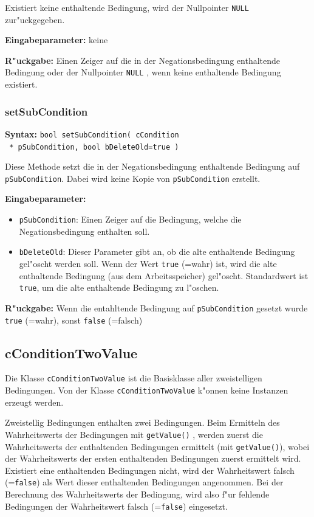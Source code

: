 Existiert keine enthaltende Bedingung, wird der Nullpointer \verb|NULL| zur"uckgegeben.

\bigskip\noindent
\textbf{Eingabeparameter:} keine

\bigskip\noindent
\textbf{R"uckgabe:} Einen Zeiger auf die in der Negationsbedingung enthaltende Bedingung oder der Nullpointer \verb|NULL| , wenn keine enthaltende Bedingung existiert.


\subsubsection{setSubCondition}

\textbf{Syntax:} \verb|bool setSubCondition( cCondition| \\\verb| * pSubCondition, bool bDeleteOld=true )|

\bigskip\noindent
Diese Methode setzt die in der Negationsbedingung enthaltende Bedingung auf \verb|pSubCondition|. Dabei wird keine Kopie von \verb|pSubCondition| erstellt.

\bigskip\noindent
\textbf{Eingabeparameter:}
\begin{itemize}
 \item \verb|pSubCondition|: Einen Zeiger auf die Bedingung, welche die Negationsbedingung enthalten soll.
 \item \verb|bDeleteOld|: Dieser Parameter gibt an, ob die alte enthaltende Bedingung gel"oscht werden soll. Wenn der Wert \verb|true| (=wahr) ist, wird die alte enthaltende Bedingung (aus dem Arbeitsspeicher) gel"oscht. Standardwert ist \verb|true|, um die alte enthaltende Bedingung zu l"oschen.
\end{itemize}

\bigskip\noindent
\textbf{R"uckgabe:} Wenn die entahltende Bedingung auf \verb|pSubCondition| gesetzt wurde \verb|true| (=wahr), sonst \verb|false| (=falsch)


\subsection{cConditionTwoValue}


Die Klasse \verb|cConditionTwoValue| ist die Basisklasse aller zweistelligen Bedingungen. Von der Klasse \verb|cConditionTwoValue| k"onnen keine Instanzen erzeugt werden.

Zweistellig Bedingungen enthalten zwei Bedingungen. Beim Ermitteln des Wahrheitswerts der Bedingungen mit \verb|getValue()| , werden zuerst die Wahrheitswerts der enthaltenden Bedingungen ermittelt (mit \verb|getValue()|), wobei der Wahrheitswerts der ersten enthaltenden Bedingungen zuerst ermittelt wird. Existiert eine enthaltenden Bedingungen nicht, wird der Wahrheitswert falsch (=\verb|false|) als Wert dieser enthaltenden Bedingungen angenommen. Bei der Berechnung des Wahrheitswerts der Bedingung, wird also f"ur fehlende Bedingungen der Wahrheitswert falsch (=\verb|false|) eingesetzt.


